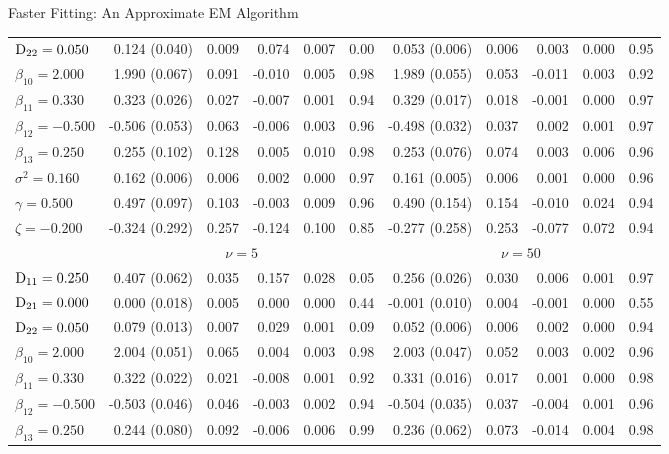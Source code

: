 \begin{chapter}{\label{cha:approx}Faster Fitting: An Approximate EM Algorithm}
\begin{table}[t]
\begin{tabular}{l|rrrrr:rrrrr}
    $\mathrm{D}_{22} = 0.050$ &  0.124 (0.040) & 0.009 &  0.074 & 0.007 & 0.00 &  0.053 (0.006) & 0.006 &  0.003 & 0.000 & 0.95 \\ 
    $\beta_{10} = 2.000$ &  1.990 (0.067) & 0.091 & -0.010 & 0.005 & 0.98 &  1.989 (0.055) & 0.053 & -0.011 & 0.003 & 0.92 \\ 
    $\beta_{11} = 0.330$ &  0.323 (0.026) & 0.027 & -0.007 & 0.001 & 0.94 &  0.329 (0.017) & 0.018 & -0.001 & 0.000 & 0.97 \\ 
    $\beta_{12} = -0.500$ & -0.506 (0.053) & 0.063 & -0.006 & 0.003 & 0.96 & -0.498 (0.032) & 0.037 &  0.002 & 0.001 & 0.97 \\ 
    $\beta_{13} = 0.250$ &  0.255 (0.102) & 0.128 &  0.005 & 0.010 & 0.98 &  0.253 (0.076) & 0.074 &  0.003 & 0.006 & 0.96 \\ 
    $\sigma^2 = 0.160$ &  0.162 (0.006) & 0.006 &  0.002 & 0.000 & 0.97 &  0.161 (0.005) & 0.006 &  0.001 & 0.000 & 0.96 \\ 
    $\gamma = 0.500$ &  0.497 (0.097) & 0.103 & -0.003 & 0.009 & 0.96 &  0.490 (0.154) & 0.154 & -0.010 & 0.024 & 0.94 \\ 
    $\zeta = -0.200$ & -0.324 (0.292) & 0.257 & -0.124 & 0.100 & 0.85 & -0.277 (0.258) & 0.253 & -0.077 & 0.072 & 0.94 \\ 
    \hline
    &  &  \\ 
    \hline
    $\mathrm{D}_{11} = 0.250$ &  0.407 (0.062) & 0.035 &  0.157 & 0.028 & 0.05 &  0.256 (0.026) & 0.030 &  0.006 & 0.001 & 0.97 \\ 
    $\mathrm{D}_{21} = 0.000$ &  0.000 (0.018) & 0.005 &  0.000 & 0.000 & 0.44 & -0.001 (0.010) & 0.004 & -0.001 & 0.000 & 0.55 \\ 
    $\mathrm{D}_{22} = 0.050$ &  0.079 (0.013) & 0.007 &  0.029 & 0.001 & 0.09 &  0.052 (0.006) & 0.006 &  0.002 & 0.000 & 0.94 \\ 
    $\beta_{10} = 2.000$ &  2.004 (0.051) & 0.065 &  0.004 & 0.003 & 0.98 &  2.003 (0.047) & 0.052 &  0.003 & 0.002 & 0.96 \\ 
    $\beta_{11} = 0.330$ &  0.322 (0.022) & 0.021 & -0.008 & 0.001 & 0.92 &  0.331 (0.016) & 0.017 &  0.001 & 0.000 & 0.98 \\ 
    $\beta_{12} = -0.500$ & -0.503 (0.046) & 0.046 & -0.003 & 0.002 & 0.94 & -0.504 (0.035) & 0.037 & -0.004 & 0.001 & 0.96 \\ 
    $\beta_{13} = 0.250$ &  0.244 (0.080) & 0.092 & -0.006 & 0.006 & 0.99 &  0.236 (0.062) & 0.073 & -0.014 & 0.004 & 0.98 \\ 

\end{tabular}
\end{table}
\end{chapter}
